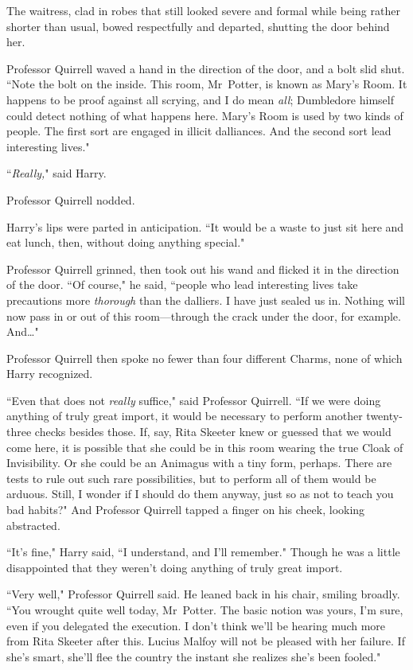 The waitress, clad in robes that still looked severe and formal while being rather shorter than usual, bowed respectfully and departed, shutting the door behind her.

Professor Quirrell waved a hand in the direction of the door, and a bolt slid shut. ``Note the bolt on the inside. This room, Mr~Potter, is known as Mary's Room. It happens to be proof against all scrying, and I do mean \emph{all}; Dumbledore himself could detect nothing of what happens here. Mary's Room is used by two kinds of people. The first sort are engaged in illicit dalliances. And the second sort lead interesting lives."

``\emph{Really,}" said Harry.

Professor Quirrell nodded.

Harry's lips were parted in anticipation. ``It would be a waste to just sit here and eat lunch, then, without doing anything special."

Professor Quirrell grinned, then took out his wand and flicked it in the direction of the door. ``Of course," he said, ``people who lead interesting lives take precautions more \emph{thorough} than the dalliers. I have just sealed us in. Nothing will now pass in or out of this room—through the crack under the door, for example. And{\ldots}"

Professor Quirrell then spoke no fewer than four different Charms, none of which Harry recognized.

``Even that does not \emph{really} suffice," said Professor Quirrell. ``If we were doing anything of truly great import, it would be necessary to perform another twenty-three checks besides those. If, say, Rita Skeeter knew or guessed that we would come here, it is possible that she could be in this room wearing the true Cloak of Invisibility. Or she could be an Animagus with a tiny form, perhaps. There are tests to rule out such rare possibilities, but to perform all of them would be arduous. Still, I wonder if I should do them anyway, just so as not to teach you bad habits?" And Professor Quirrell tapped a finger on his cheek, looking abstracted.

``It's fine," Harry said, ``I understand, and I'll remember." Though he was a little disappointed that they weren't doing anything of truly great import.

``Very well," Professor Quirrell said. He leaned back in his chair, smiling broadly. ``You wrought quite well today, Mr~Potter. The basic notion was yours, I'm sure, even if you delegated the execution. I don't think we'll be hearing much more from Rita Skeeter after this. Lucius Malfoy will not be pleased with her failure. If she's smart, she'll flee the country the instant she realizes she's been fooled."

